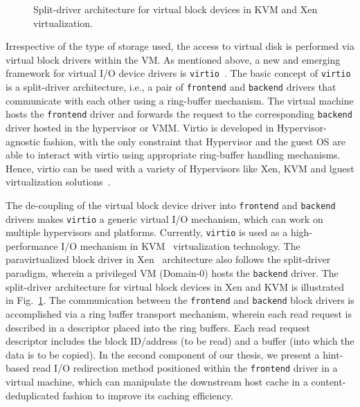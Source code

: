 \begin{figure}[t]
   \caption{Split-driver architecture for virtual block devices in KVM and Xen virtualization.}
   \label{fig:disk-io-arch}
\end{figure}

Irrespective of the type of storage used, the access to virtual disk is
performed via virtual block drivers within the VM. 
As mentioned above, a new and emerging framework for 
virtual I/O device drivers is \texttt{virtio}~\cite{virtio}. 
The basic concept of \texttt{virtio} is a split-driver
architecture, i.e., a pair of \texttt{frontend} 
and \texttt{backend} drivers that communicate with each other using
a ring-buffer mechanism.
The virtual machine hosts the \texttt{frontend} driver and forwards the
request to the corresponding \texttt{backend} driver hosted in the 
hypervisor or VMM.
Virtio is developed in Hypervisor-agnostic fashion, with the only
constraint that Hypervisor and the guest OS are able to interact
with virtio using appropriate ring-buffer handling mechanisms.
Hence, virtio can be used
with a variety of Hypervisors like Xen, KVM and lguest virtualization 
solutions~\cite{virtio}.

The de-coupling of the virtual block device driver 
into \texttt{frontend} and \texttt{backend} drivers
makes \texttt{virtio}
a generic virtual I/O mechanism, which can work on multiple hypervisors
and platforms. Currently, \texttt{virtio} is used as a high-performance
I/O mechanism in KVM~\cite{kvm} virtualization technology. 
The paravirtualized block driver in Xen~\cite{xen} architecture also follows
the split-driver paradigm, wherein a privileged VM (Domain-0) hosts the 
\texttt{backend} driver. The split-driver architecture for virtual block devices
in Xen and KVM is illustrated in Fig.~\ref{fig:disk-io-arch}.
The communication between the \texttt{frontend} and \texttt{backend} block drivers is 
accomplished via a ring buffer transport mechanism, wherein each read
request is described in a descriptor placed into the ring buffers. Each
read request descriptor includes the block ID/address (to be read) and a 
buffer (into which the data is to be copied). 
In the second component of our thesis, we present a hint-based read
I/O redirection method positioned within the \texttt{frontend}
driver in a virtual machine, which can manipulate the downstream 
host cache in a content-deduplicated
fashion to improve its caching efficiency.
